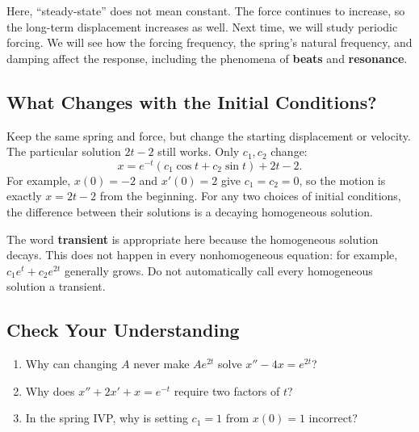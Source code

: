 \documentclass[10pt,letterpaper]{article}
\begin{document}
Here, ``steady-state'' does not mean constant. The force
continues to increase, so the long-term displacement
increases as well. Next time, we will study periodic forcing. We will see how
the forcing frequency, the spring's natural frequency,
and damping affect the response, including the phenomena
of \textbf{beats} and \textbf{resonance}.



\subsection{What Changes with the Initial Conditions?}
Keep the same spring and force, but change the starting displacement or
velocity. The particular solution $2t-2$ still works. Only $c_1,c_2$ change:
\[
x=e^{-t}(c_1\cos t+c_2\sin t)+2t-2.
\]
For example, $x(0)=-2$ and $x'(0)=2$ give $c_1=c_2=0$, so the motion
is exactly $x=2t-2$ from the beginning.
For any two choices of initial conditions, the difference between their
solutions is a decaying homogeneous solution.

The word \textbf{transient} is appropriate here because the homogeneous
solution decays. This does not happen in every nonhomogeneous equation:
for example, $c_1e^t+c_2e^{2t}$ generally grows. Do not automatically call
every homogeneous solution a transient.

\subsection{Check Your Understanding}
\begin{enumerate}
\item Why can changing $A$ never make $Ae^{2t}$ solve $x''-4x=e^{2t}$?
\item Why does $x''+2x'+x=e^{-t}$ require two factors of $t$?
\item In the spring IVP, why is setting $c_1=1$ from $x(0)=1$ incorrect?
\end{enumerate}
\end{document}
